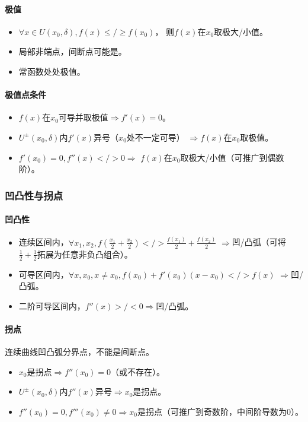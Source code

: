 \documentclass[
12pt, %
a4paper, 
oneside, %
headinclude,footinclude, %
]{scrartcl}
\begin{document}
\paragraph{极值}
\begin{itemize}
\item $ \forall x \in U(x_0, \delta), f(x) \leq/\geq f(x_0) $，
则$ f(x) $在$ x_0 $取极大/小值。
\item 局部非端点，间断点可能是。
\item 常函数处处极值。
\end{itemize}
\paragraph{极值点条件}
\begin{itemize}
\item $ f(x) $在$ x_0 $可导并取极值$ \Rightarrow $$ f'(x) = 0 $。
\item $ U^\pm (x_0, \delta) $内$ f'(x) $异号（$ x_0 $处不一定可导）
$ \Rightarrow $$ f(x) $在$ x_0 $取极值。
\item $ f'(x_0) = 0 , f''(x) </> 0 $$ \Rightarrow $
$ f(x) $在$ x_0 $取极大/小值（可推广到偶数阶）。
\end{itemize}
\subsubsection[凹凸性与拐点]{凹凸性与拐点}
\paragraph{凹凸性}
\begin{itemize}
\item 连续区间内，$ \forall x_1,x_2, f(\frac{x_1}{2} + \frac{x_2}{2}) </> \frac{f(x_1)}{2} + \frac{f(x_2)}{2} $
$ \Rightarrow $凹/凸弧（可将$ \frac{1}{2} + \frac{1}{2} $拓展为任意非负凸组合）。
\item 可导区间内，$ \forall x,x_0, x \neq x_0, f(x_0) + f'(x_0) (x - x_0) </> f(x) $
$ \Rightarrow $凹/凸弧。
\item 二阶可导区间内，$ f''(x) >/< 0 $$ \Rightarrow $凹/凸弧。
\end{itemize}
\paragraph{拐点}
连续曲线凹凸弧分界点，不能是间断点。
\begin{itemize}
\item $ x_0 $是拐点$ \Rightarrow $$ f''(x_0) = 0 $（或不存在）。
\item $ U^{\pm}(x_0, \delta) $内$ f''(x) $异号$ \Rightarrow $$ x_0 $是拐点。
\item $ f''(x_0) = 0, f'''(x_0) \neq 0 $$ \Rightarrow $$ x_0 $是拐点（可推广到奇数阶，中间阶导数为$ 0 $）。
\end{itemize}
\end{document}
